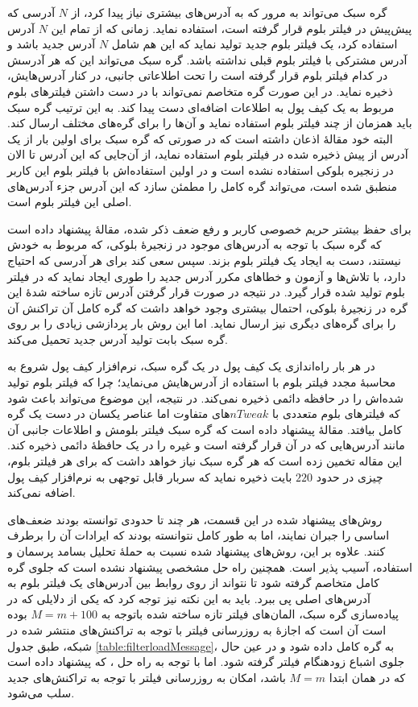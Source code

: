 	گره سبک می‌تواند به مرور که به آدرس‌های بیشتری نیاز پیدا کرد، از $N$ آدرسی که پیش‌پیش در فیلتر بلوم قرار گرفته است، استفاده نماید. زمانی که از تمام این $N$ آدرس استفاده کرد، یک فیلتر بلوم جدید تولید نماید که این هم شامل $N$ آدرس جدید باشد و آدرس مشترکی با فیلتر بلوم قبلی نداشته باشد. گره سبک می‌تواند این که هر آدرسش در کدام فیلتر بلوم قرار گرفته‌ است را تحت اطلاعاتی جانبی، در کنار آدرس‌هایش، ذخیره نماید. در این صورت گره متخاصم نمی‌تواند با در دست داشتن فیلتر‌های بلوم مربوط به یک کیف پول به اطلاعات اضافه‌ای دست پیدا کند. به این ترتیب گره سبک باید همزمان از چند فیلتر بلوم استفاده نماید و آن‌ها را برای گره‌های مختلف ارسال کند. البته خود مقالهٔ \cite{Gervais2014} اذعان داشته است که در صورتی که گره سبک برای اولین بار از یک آدرس از پیش ذخیره شده در فیلتر بلوم استفاده نماید، از آن‌جایی که این آدرس تا الان در زنجیره بلوکی استفاده نشده است و در اولین استفاده‌اش با فیلتر بلوم این کاربر منطبق شده است، می‌تواند گره کامل را مطمئن سازد که این آدرس جزء آدرس‌های اصلی این فیلتر بلوم است.
	
	برای حفظ بیشتر حریم خصوصی کاربر و رفع ضعف ذکر شده، مقالهٔ \cite{Gervais2014} پیشنهاد داده است که گره سبک با توجه به آدرس‌های موجود در زنجیرهٔ بلوکی، که مربوط به خودش نیستند، دست به ایجاد یک فیلتر بلوم بزند. سپس سعی کند برای هر آدرسی که احتیاج دارد، با تلاش‌ها و آزمون‌ و خطا‌های مکرر آدرس جدید را طوری ایجاد نماید که در فیلتر بلوم تولید شده قرار گیرد. در نتیجه در صورت قرار گرفتن آدرس تازه ساخته شدهٔ این گره در زنجیرهٔ بلوکی، احتمال بیشتری وجود خواهد داشت که گره کامل آن تراکنش آن را برای گره‌های دیگری نیز ارسال نماید. اما این روش بار پردازشی زیادی را بر روی گره سبک بابت تولید آدرس جدید تحمیل می‌کند.  
	
در هر بار راه‌اندازی یک کیف پول در یک گره سبک، نرم‌افزار کیف پول شروع به محاسبهٔ مجدد فیلتر بلوم با استفاده از آدرس‌هایش می‌نماید؛ چرا که فیلتر بلوم تولید شده‌اش را در حافظه دائمی ذخیره نمی‌کند. در نتیجه، این موضوع می‌تواند باعث شود که فیلتر‌های بلوم متعددی با $nTweak$های متفاوت اما عناصر یکسان در دست یک گره کامل بیافتد. مقالهٔ \cite{Gervais2014} پیشنهاد داده است که گره سبک فیلتر بلومش و اطلاعات جانبی آن مانند آدرس‌هایی که در آن قرار گرفته است و غیره را در یک حافظهٔ دائمی ذخیره کند. این مقاله تخمین زده است که هر گره سبک نیاز خواهد داشت که برای هر فیلتر بلوم، چیزی در حدود $220$ بایت ذخیره نماید که سربار قابل توجهی به نرم‌افزار کیف پول اضافه نمی‌کند.
	
	روش‌های پیشنهاد شده در این قسمت، هر چند تا حدودی توانسته بودند ضعف‌های اساسی \cite{Hearn2013} را جبران نمایند، اما به طور کامل نتوانسته بودند که ایرادات آن را برطرف کنند.  علاوه بر این، روش‌های پیشنهاد شده نسبت به حملهٔ تحلیل بسامد پرسمان و استفاده، آسیب پذیر است. همچنین راه حل مشخصی  پیشنهاد نشده است که جلوی گره کامل متخاصم گرفته شود تا نتواند از روی روابط بین آدرس‌های یک فیلتر بلوم به آدرس‌های اصلی پی ببرد. باید به این نکته نیز توجه کرد که یکی از دلایلی که در پیاده‌سازی گره سبک، المان‌های فیلتر تازه ساخته شده باتوجه به $M=m+100$ بوده است آن است که اجازهٔ به روزرسانی فیلتر با توجه به تراکنش‌های منتشر شده در شبکه، طبق جدول \ref{table:filterloadMessage}، به گره کامل داده شود و در عین حال جلوی اشباع زودهنگام فیلتر گرفته شود. اما با توجه به راه حل \cite{Gervais2014}، که پیشنهاد داده است که در همان ابتدا $M=m$ باشد، امکان به روزرسانی فیلتر با توجه به تراکنش‌های جدید سلب می‌شود.


